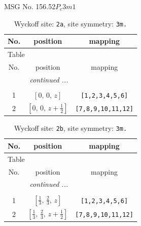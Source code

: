 \documentclass[fleqn,8pt]{jsarticle}
\begin{document}
\setcounter{MaxMatrixCols}{32}

\renewcommand{\tablename}{Table~}
\renewcommand{\figurename}{Figure~}
\begin{center}
\LARGE
MSG No. 156.52\quad$P_{c}3m1$
\end{center}
\renewcommand{\arraystretch}{1.2}
\begin{longtable}{ccc}
\caption{Wyckoff site: {\tt 2a}, site symmetry: {\tt 3m.}}
 \\
 \hline \hline
No. & position & mapping \\ \hline \endfirsthead

\multicolumn{2}{l}{\tablename\ \thetable{}} \\
 \hline \hline
No. & position & mapping \\ \hline \endhead

 \hline \hline
\multicolumn{2}{r}{\footnotesize\it continued ...} \\ \endfoot

 \hline \hline
\multicolumn{2}{r}{} \\ \endlastfoot

1 & $\left[ 0,\, 0,\, z \right]$ & {\tt [1,2,3,4,5,6]} \\ \hline
2 & $\left[ 0,\, 0,\, z + \frac{1}{2} \right]$ & {\tt [7,8,9,10,11,12]} \\
\end{longtable}
\renewcommand{\arraystretch}{1.2}
\begin{longtable}{ccc}
\caption{Wyckoff site: {\tt 2b}, site symmetry: {\tt 3m.}}
 \\
 \hline \hline
No. & position & mapping \\ \hline \endfirsthead

\multicolumn{2}{l}{\tablename\ \thetable{}} \\
 \hline \hline
No. & position & mapping \\ \hline \endhead

 \hline \hline
\multicolumn{2}{r}{\footnotesize\it continued ...} \\ \endfoot

 \hline \hline
\multicolumn{2}{r}{} \\ \endlastfoot

1 & $\left[ \frac{1}{3},\, \frac{2}{3},\, z \right]$ & {\tt [1,2,3,4,5,6]} \\ \hline
2 & $\left[ \frac{1}{3},\, \frac{2}{3},\, z + \frac{1}{2} \right]$ & {\tt [7,8,9,10,11,12]} \\
\end{longtable}
\end{document}

